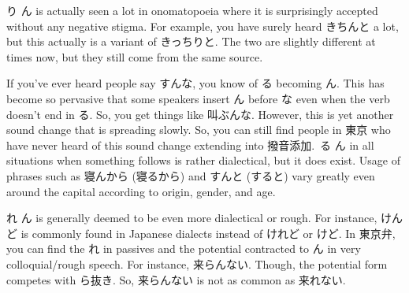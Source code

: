 \par{ り \textrightarrow  ん is actually seen a lot in onomatopoeia where it is surprisingly accepted without any negative stigma. For example, you have surely heard きちんと a lot, but this actually is a variant of きっちりと. The two are slightly different at times now, but they still come from the same source. }

\par{ If you've ever heard people say すんな, you know of る becoming ん. This has become so pervasive that some speakers insert ん before な even when the verb doesn't end in る. So, you get things like 叫ぶんな. However, this is yet another sound change that is spreading slowly. So, you can still find people in 東京 who have never heard of this sound change extending into 撥音添加. る \textrightarrow  ん in all situations when something follows is rather dialectical, but it does exist. Usage of phrases such as 寝んから (寝るから) and すんと (すると) vary greatly even around the capital according to origin, gender, and age. }

\par{ れ \textrightarrow  ん is generally deemed to be even more dialectical or rough. For instance, けんど is commonly found in Japanese dialects instead of けれど or けど. In 東京弁, you can find the れ in passives and the potential contracted to ん in very colloquial\slash rough speech. For instance, 来らんない. Though, the potential form competes with ら抜き. So, 来らんない is not as common as 来れない. }
    
